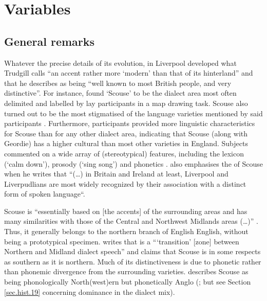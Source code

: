 \chapter{Variables}
\label{ch.var}

	\section{General remarks}\label{sec.var.general}

Whatever the precise details of its evolution, in Liverpool developed what Trudgill calls ``an accent rather more `modern' than that of its hinterland'' \citep[70]{trudgill1999} and that he describes as being ``well known to most British people, and very distinctive''.
For instance, \textcite{montgomery2007} found `Scouse' to be the dialect area most often delimited and labelled by lay participants in a map drawing task.
Scouse also turned out to be the most stigmatised of the language varieties mentioned by said participants \citep[cf.][194 and 254]{montgomery2007}.
Furthermore, participants provided more linguistic characteristics for Scouse than for any other dialect area, indicating that Scouse (along with Geordie) has a higher cultural  than most other varieties in England.
Subjects commented on a wide array of (stereotypical) features, including the lexicon (`calm down'), prosody (`sing song') and phonetics \citep[cf.][180--181]{montgomery2007a}.
\textcite[15]{crowley2012} also emphasises the  of Scouse when he writes that ``(\dots) in Britain and Ireland at least, Liverpool and Liverpudlians are most widely recognized by their association with a distinct form of spoken language``.

Scouse is ``essentially based on [the accents] of the surrounding areas and has many similarities with those of the Central  and Northwest Midlands areas (\dots)'' \citep[70]{trudgill1999}.
Thus, it generally belongs to the northern branch of English English, without being a prototypical specimen.
\citet[18]{wales2006} writes that  is a ```transition' [zone] between Northern and Midland dialect speech'' and \citet[72]{trudgill1999} claims that Scouse is in some respects as southern as it is northern.
Much of its distinctiveness is due to phonetic rather than phonemic divergence from the surrounding varieties. \textcite{knowles1973} describes Scouse as being phonologically North(west)ern but phonetically Anglo  (\citealt[cf. also][80]{knowles1978}; but see Section \ref{sec.hist.19} concerning  dominance in the dialect mix).

